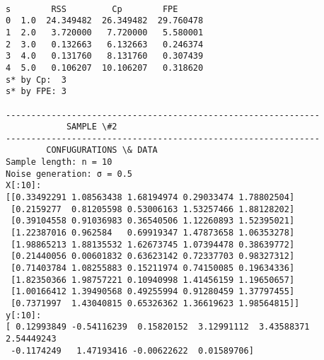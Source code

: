 \documentclass[11pt]{article}
\begin{document}
    \begin{center}
    \end{center}
    { \hspace*{\fill} \\}
    
    \begin{Verbatim}[commandchars=\\\{\}]
     s        RSS         Cp        FPE
0  1.0  24.349482  26.349482  29.760478
1  2.0   3.720000   7.720000   5.580001
2  3.0   0.132663   6.132663   0.246374
3  4.0   0.131760   8.131760   0.307439
4  5.0   0.106207  10.106207   0.318620
s* by Cp:  3
s* by FPE: 3

--------------------------------------------------------------
			SAMPLE \#2
--------------------------------------------------------------
		CONFUGURATIONS \& DATA
Sample length: n = 10
Noise generation: σ = 0.5
X[:10]:
[[0.33492291 1.08563438 1.68194974 0.29033474 1.78802504]
 [0.2159277  0.81205598 0.53006163 1.53257466 1.88128202]
 [0.39104558 0.91036983 0.36540506 1.12260893 1.52395021]
 [1.22387016 0.962584   0.69919347 1.47873658 1.06353278]
 [1.98865213 1.88135532 1.62673745 1.07394478 0.38639772]
 [0.21440056 0.00601832 0.63623142 0.72337703 0.98327312]
 [0.71403784 1.08255883 0.15211974 0.74150085 0.19634336]
 [1.82350366 1.98757221 0.10940998 1.41456159 1.19650657]
 [1.00166412 1.39490568 0.49255994 0.91280459 1.37797455]
 [0.7371997  1.43040815 0.65326362 1.36619623 1.98564815]]
y[:10]:
[ 0.12993849 -0.54116239  0.15820152  3.12991112  3.43588371  2.54449243
 -0.1174249   1.47193416 -0.00622622  0.01589706]


\end{Verbatim}
\end{document}
